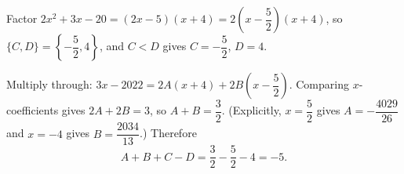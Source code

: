 Factor $2x^2+3x-20=(2x-5)(x+4)=2\left(x-\dfrac52\right)(x+4)$, so $\{C,D\}=\left\{-\dfrac52,4\right\}$, and $C<D$ gives $C=-\dfrac52$, $D=4$.

Multiply through: $3x-2022=2A(x+4)+2B\left(x-\dfrac52\right)$. Comparing $x$-coefficients gives $2A+2B=3$, so $A+B=\dfrac32$. (Explicitly, $x=\dfrac52$ gives $A=-\dfrac{4029}{26}$ and $x=-4$ gives $B=\dfrac{2034}{13}$.) Therefore
\[A+B+C-D=\dfrac32-\dfrac52-4=\boxed{-5}.\]
